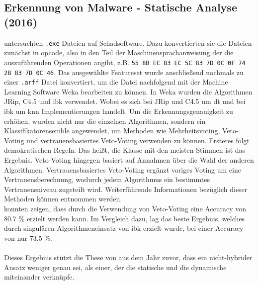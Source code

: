 \documentclass[
    12pt, %
    DIV10,
    ngerman, %
    a4paper, %
    oneside, %
    titlepage, %
    parskip=half, %
    headings=normal, %
    listof=totoc, %
    bibliography=totoc, %
    index=totoc, %
    captions=tableheading, %
    final %
]{scrreprt}
\begin{document}
\subsection{Erkennung von Malware - Statische Analyse (2016)}
\textcite{More2016} untersuchten \texttt{.exe} Dateien auf Schadsoftware. Dazu konvertierten sie die Dateien zunächst in \ac{opcode}, also in den Teil der Maschinensprachanweisung der die auszuführenden Operationen angibt, z.B. \texttt{55 8B EC 83 EC 5C 83 7D 0C 0F 74 2B 83 7D 0C 46}. Das ausgewählte Featureset wurde anschlie{\ss}end nochmals zu einer \texttt{.arff} Datei konvertiert, um die Datei nachfolgend mit der Machine Learning Software Weka bearbeiten zu können. 
In Weka wurden die Algorithmen JRip, C4.5 und \ac{ibk} verwendet. Wobei es sich bei JRip und C4.5 um \ac{dt} und bei \ac{ibk} um \ac{knn} Implementierungen handelt. Um die Erkennungsgenauigkeit zu erhöhen, wurden nicht nur die einzelnen Algorithmen, sondern ein Klassifikatorensemble angewendet, um Methoden wie Mehrheitsvoting, Veto-Voting und vertrauensbasiertes Veto-Voting verwenden zu können. Ersteres folgt demokratischen Regeln. Das hei{\ss}t, die Klasse mit den meisten Stimmen ist das Ergebnis. Veto-Voting hingegen basiert auf Annahmen über die Wahl der anderen Algorithmen. Vertrauensbasiertes Veto-Voting ergänzt voriges Voting um eine Vertrauensberechnung, wodurch jedem Algorithmus ein bestimmtes Vertrauensniveau zugeteilt wird. Weiterführende Informationen bezüglich dieser Methoden können \textcite{shahzad2013comparative} entnommen werden. \\
\textcite{More2016} konnten zeigen, dass durch die Verwendung von Veto-Voting eine Accuracy von 80.7 \% erzielt werden kann. Im Vergleich dazu, lag das beste Ergebnis, welches durch singulären Algorithmeneinsatz von \ac{ibk} erzielt wurde, bei einer Accuracy von nur 73.5 \%.\\\\
Dieses Ergebnis stützt die These von \textcite{Shijo2015} aus dem Jahr zuvor, dass ein nicht-hybrider Ansatz weniger genau sei, als einer, der die statische und die dynamische miteinander verknüpfe.
\end{document}

